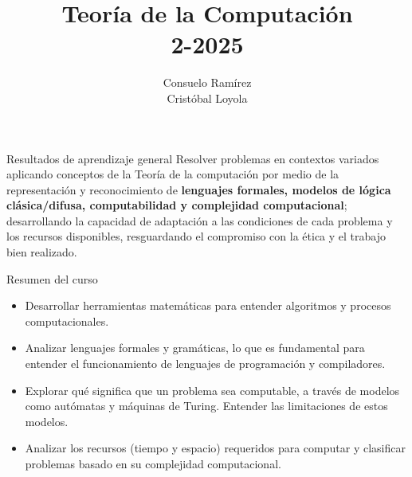 \documentclass{beamer}
\begin{document}
\title[Presentación del curso]{Teoría de la Computación \\ 2-2025}
\author[Teoría de la Computación]{Consuelo Ramírez \\ Cristóbal Loyola}
\date{}
\frame{\titlepage}

\begin{frame}{Resultados de aprendizaje general}
  Resolver problemas en contextos variados aplicando conceptos de la Teoría de
  la computación por medio de la representación y reconocimiento de
  \textbf{lenguajes formales, modelos de lógica clásica/difusa, computabilidad y
    complejidad computacional}; desarrollando la capacidad de adaptación a las
  condiciones de cada problema y los recursos disponibles, resguardando el
  compromiso con la ética y el trabajo bien realizado.
\end{frame}


\begin{frame}{Resumen del curso}
  \begin{itemize}[<+->]
    \item Desarrollar herramientas matemáticas para entender algoritmos y
          procesos computacionales.
    \item Analizar lenguajes formales y gramáticas, lo que es fundamental para
          entender el funcionamiento de lenguajes de programación y
          compiladores.
    \item Explorar qué significa que un problema sea computable, a través de
          modelos como autómatas y máquinas de Turing. Entender las
          limitaciones de estos modelos.
    \item Analizar los recursos (tiempo y espacio) requeridos para computar y
          clasificar problemas basado en su complejidad computacional.
  \end{itemize}
\end{frame}
\end{document}
